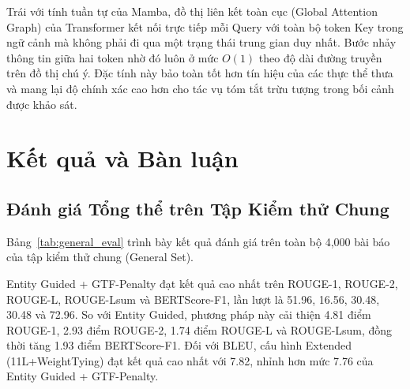 \documentclass[11pt,a4paper]{article}
\numberwithin{equation}{section}
\begin{document}
Trái với tính tuần tự của Mamba, đồ thị liên kết toàn cục (Global Attention Graph) của Transformer kết nối trực tiếp mỗi Query với toàn bộ token Key trong ngữ cảnh mà không phải đi qua một trạng thái trung gian duy nhất. Bước nhảy thông tin giữa hai token nhờ đó luôn ở mức $O(1)$ theo độ dài đường truyền trên đồ thị chú ý. Đặc tính này bảo toàn tốt hơn tín hiệu của các thực thể thưa và mang lại độ chính xác cao hơn cho tác vụ tóm tắt trừu tượng trong bối cảnh được khảo sát.

\section{Kết quả và Bàn luận}
\label{sec:results}

\subsection{Đánh giá Tổng thể trên Tập Kiểm thử Chung}

Bảng~\ref{tab:general_eval} trình bày kết quả đánh giá trên toàn bộ 4,000 bài báo của tập kiểm thử chung (General Set).

\begin{table}[htbp]
\centering
\caption{Kết quả đánh giá trên tập kiểm thử chung (General Set, $n=4{,}000$). Giá trị in đậm biểu thị kết quả tốt nhất trên từng cột.}
\label{tab:general_eval}
\end{table}

Entity Guided + GTF-Penalty đạt kết quả cao nhất trên ROUGE-1, ROUGE-2, ROUGE-L, ROUGE-Lsum và BERTScore-F1, lần lượt là 51.96, 16.56, 30.48, 30.48 và 72.96. So với Entity Guided, phương pháp này cải thiện 4.81 điểm ROUGE-1, 2.93 điểm ROUGE-2, 1.74 điểm ROUGE-L và ROUGE-Lsum, đồng thời tăng 1.93 điểm BERTScore-F1. Đối với BLEU, cấu hình Extended (11L+WeightTying) đạt kết quả cao nhất với 7.82, nhỉnh hơn mức 7.76 của Entity Guided + GTF-Penalty.
\end{document}
